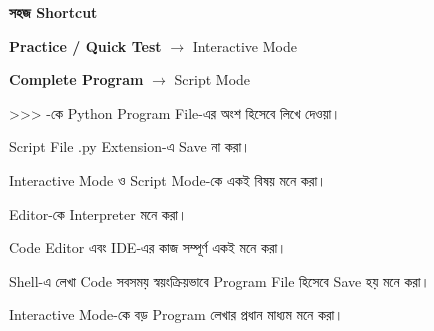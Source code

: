 \begin{rememberbox}

\textbf{\color{deepOrange}সহজ Shortcut}

\textbf{Practice / Quick Test}
\(\longrightarrow\)
Interactive Mode

\medskip

\textbf{Complete Program}
\(\longrightarrow\)
Script Mode

\end{rememberbox}



\begin{compacttwocolpoints}

\item
\textenglish{\ttfamily >>>}
-কে Python Program File-এর অংশ হিসেবে লিখে দেওয়া।

\item
Script File
\textenglish{\ttfamily .py}
Extension-এ Save না করা।

\item
Interactive Mode ও Script Mode-কে একই বিষয় মনে করা।

\item
Editor-কে Interpreter মনে করা।

\item
Code Editor এবং IDE-এর কাজ সম্পূর্ণ একই মনে করা।

\item
Shell-এ লেখা Code সবসময় স্বয়ংক্রিয়ভাবে Program File হিসেবে
Save হয় মনে করা।

\item
Interactive Mode-কে বড় Program লেখার প্রধান মাধ্যম মনে করা।

\end{compacttwocolpoints}


